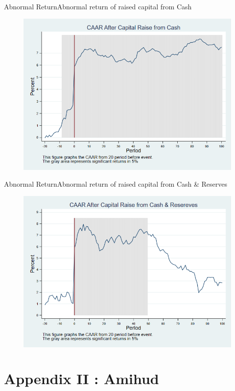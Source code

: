 \documentclass{beamer}
\begin{document}
\begin{frame}{Abnormal Return}{Abnormal return of raised capital from Cash}
\label{abreturncashMarket}
\begin{figure}
\centering
\includegraphics[width=0.65\linewidth]{AbReturnCash_Market}
\label{fig:abreturncash4}
\end{figure}
\hfill\hyperlink{abreturncash}{}
\end{frame}


\begin{frame}{Abnormal Return}{Abnormal return of raised capital from Cash \& Reserves}
\label{abreturnhybridMarket}
\begin{figure}
\centering
\includegraphics[width=0.65\linewidth]{AbReturnHybrid_Market}
\label{fig:abreturnhybrid4}
\end{figure}
\hfill\hyperlink{abreturnhybrid}{}
\end{frame}




\section{Appendix II : Amihud}
\end{document}
